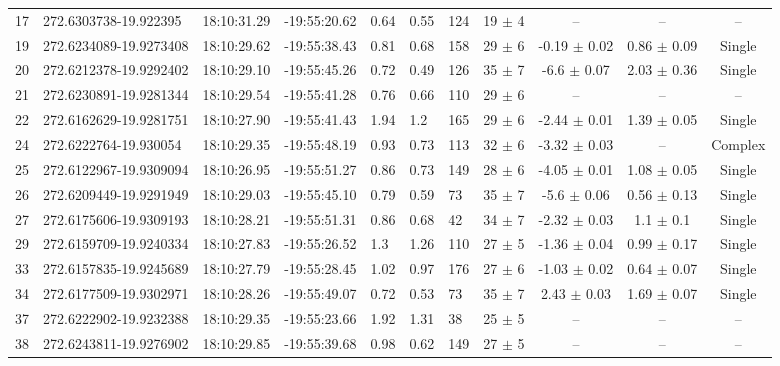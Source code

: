 \begin{table}[htbp!]
\begin{tabular}{llllllllccc}
17  &  272.6303738-19.922395  &  18:10:31.29  &  -19:55:20.62  &  0.64  &  0.55  &  124  &  19 $\pm$ 4  &  --  &  --  &  -- \\
19  &  272.6234089-19.9273408  &  18:10:29.62  &  -19:55:38.43  &  0.81  &  0.68  &  158  &  29 $\pm$ 6  &  -0.19 $\pm$ 0.02  &  0.86 $\pm$ 0.09  &  Single \\
20  &  272.6212378-19.9292402  &  18:10:29.10  &  -19:55:45.26  &  0.72  &  0.49  &  126  &  35 $\pm$ 7  &  -6.6 $\pm$ 0.07  &  2.03 $\pm$ 0.36  &  Single \\
21  &  272.6230891-19.9281344  &  18:10:29.54  &  -19:55:41.28  &  0.76  &  0.66  &  110  &  29 $\pm$ 6  &  --  &  --  &  -- \\
22  &  272.6162629-19.9281751  &  18:10:27.90  &  -19:55:41.43  &  1.94  &  1.2  &  165  &  29 $\pm$ 6  &  -2.44 $\pm$ 0.01  &  1.39 $\pm$ 0.05  &  Single \\
24  &  272.6222764-19.930054  &  18:10:29.35  &  -19:55:48.19  &  0.93  &  0.73  &  113  &  32 $\pm$ 6  &  -3.32 $\pm$ 0.03  &  --  &  Complex \\
25  &  272.6122967-19.9309094  &  18:10:26.95  &  -19:55:51.27  &  0.86  &  0.73  &  149  &  28 $\pm$ 6  &  -4.05 $\pm$ 0.01  &  1.08 $\pm$ 0.05  &  Single \\
26  &  272.6209449-19.9291949  &  18:10:29.03  &  -19:55:45.10  &  0.79  &  0.59  &  73  &  35 $\pm$ 7  &  -5.6 $\pm$ 0.06  &  0.56 $\pm$ 0.13  &  Single \\
27  &  272.6175606-19.9309193  &  18:10:28.21  &  -19:55:51.31  &  0.86  &  0.68  &  42  &  34 $\pm$ 7  &  -2.32 $\pm$ 0.03  &  1.1 $\pm$ 0.1  &  Single \\
29  &  272.6159709-19.9240334  &  18:10:27.83  &  -19:55:26.52  &  1.3  &  1.26  &  110  &  27 $\pm$ 5  &  -1.36 $\pm$ 0.04  &  0.99 $\pm$ 0.17  &  Single \\
33  &  272.6157835-19.9245689  &  18:10:27.79  &  -19:55:28.45  &  1.02  &  0.97  &  176  &  27 $\pm$ 6  &  -1.03 $\pm$ 0.02  &  0.64 $\pm$ 0.07  &  Single \\
34  &  272.6177509-19.9302971  &  18:10:28.26  &  -19:55:49.07  &  0.72  &  0.53  &  73  &  35 $\pm$ 7  &  2.43 $\pm$ 0.03  &  1.69 $\pm$ 0.07  &  Single \\
37  &  272.6222902-19.9232388  &  18:10:29.35  &  -19:55:23.66  &  1.92  &  1.31  &  38  &  25 $\pm$ 5  &  --  &  --  &  -- \\
38  &  272.6243811-19.9276902  &  18:10:29.85  &  -19:55:39.68  &  0.98  &  0.62  &  149  &  27 $\pm$ 5  &  --  &  --  &  -- \\

\end{tabular}
\end{table}
